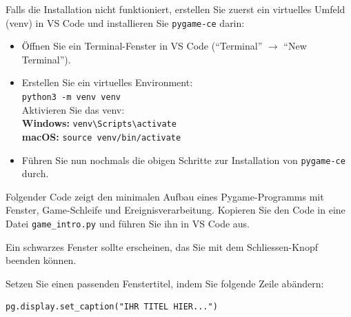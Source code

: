 \begin{myattention}
    Falls die Installation nicht funktioniert, erstellen Sie zuerst ein virtuelles Umfeld (venv) in VS Code und installieren Sie \texttt{pygame-ce} darin:
    \begin{itemize}
        \item Öffnen Sie ein Terminal-Fenster in VS Code (\enquote{Terminal} $\rightarrow$ \enquote{New Terminal}).
        \item Erstellen Sie ein virtuelles Environment:\\
              \lstinline|python3 -m venv venv|\\
              Aktivieren Sie das venv:\\
              \textbf{Windows:} \lstinline|venv\Scripts\activate|\\
              \textbf{macOS:} \lstinline|source venv/bin/activate|
        \item Führen Sie nun nochmals die obigen Schritte zur Installation von \texttt{pygame-ce} durch.
    \end{itemize}
\end{myattention}

\begin{myexample}
Folgender Code zeigt den minimalen Aufbau eines Pygame-Programms mit Fenster, Game-Schleife und Ereignisverarbeitung. Kopieren Sie den Code in eine Datei \texttt{game\_intro.py} und führen Sie ihn in VS Code aus.

Ein schwarzes Fenster sollte erscheinen, das Sie mit dem Schliessen-Knopf beenden können.
\end{myexample}

\begin{myexercise}
    Setzen Sie einen passenden Fenstertitel, indem Sie folgende Zeile abändern:

    \begin{lstlisting}
pg.display.set_caption("IHR TITEL HIER...")
\end{lstlisting}
\end{myexercise}

